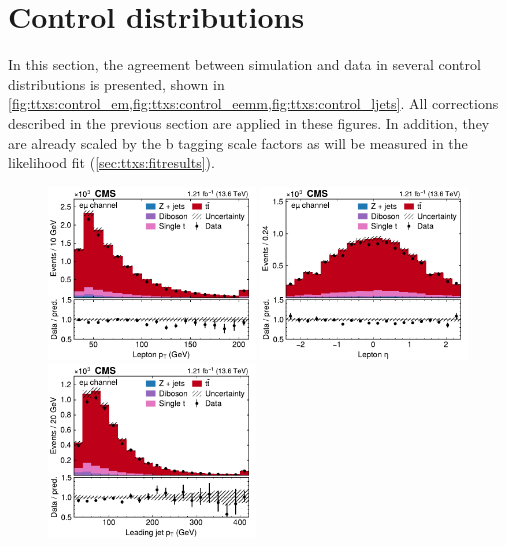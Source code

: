 \section{Control distributions}
\label{sec:ttxs:control}

In this section, the agreement between simulation and data in several control distributions is presented, shown in \cref{fig:ttxs:control_em,fig:ttxs:control_eemm,fig:ttxs:control_ljets}. All corrections described in the previous section are applied in these figures. In addition, they are already scaled by the b tagging scale factors as will be measured in the likelihood fit (\cref{sec:ttxs:fitresults}).

\begin{figure}[!hp]
\centering
\includegraphics[width=0.49\textwidth]{figures/ttxs/lep_pt_em.pdf}
\hfill
\includegraphics[width=0.49\textwidth]{figures/ttxs/lep_eta_em.pdf}
\includegraphics[width=0.49\textwidth]{figures/ttxs/1st_jet_pt_em.pdf}

\end{figure}

